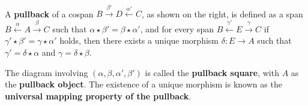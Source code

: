 \begin{definition}
    \label{def:cat:pb}
    \ \newline
\noindent
\begin{minipage}{0.7\textwidth}  
   A \textbf{pullback} of a cospan \(B \overset{\beta'}{\rightarrow} D \overset{\alpha'}{\leftarrow} C \), as shown on the right, is defined as a span \( B \overset{\alpha}{\leftarrow} A \overset{\beta}{\rightarrow} C \) such that \( \alpha \star \beta' = \beta \star \alpha' \), and for every span \( B \overset{\gamma'}{\leftarrow} E \overset{\gamma}{\rightarrow} C \) if \(\gamma' \star \beta' = \gamma \star \alpha'\) holds, then there exists a unique morphism \(\delta: E \to A\) such that $\gamma' = \delta \star \alpha$ and $\gamma = \delta \star \beta$. 
\end{minipage}
\hfill
\begin{minipage}{0.299\textwidth}
    \hfill
{}
\end{minipage}
The diagram involving \( (\alpha, \beta, \alpha', \beta') \) is called the \textbf{pullback square}, with \(A\) as the \textbf{pullback object}. The existence of a unique morphism is known as the \textbf{universal mapping property of the pullback}.
\end{definition} 

